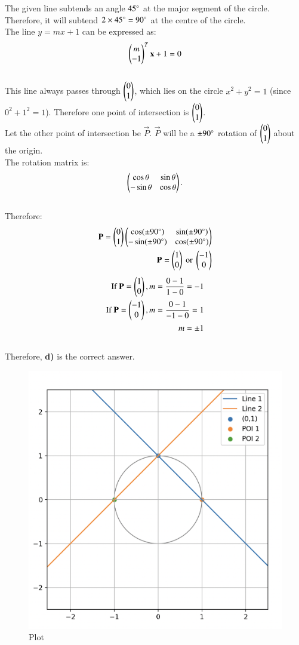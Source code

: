 \documentclass[12pt]{article}
\begin{document}
The given line subtends an angle $45\degree$ at the major segment of the circle. Therefore, it will subtend $2\times 45\degree = 90\degree$ at the centre of the circle.\vspace{0.6cm}\\
The line $y = mx + 1$ can be expressed as:
\begin{align}
    \begin{pmatrix}m\\-1\end{pmatrix}^T\mathbf{x} + 1 =0
\end{align}\\
This line always passes through $\begin{pmatrix}0\\1\end{pmatrix}$, which lies on the circle $x^2 + y^2 = 1$ (since $0^2 + 1^2 = 1$). Therefore one point of intersection is $\begin{pmatrix}0\\1\end{pmatrix}$.\vspace{0.6cm}\\
Let the other point of intersection be $\vec{P}$. $\vec{P}$ will be a $\pm 90\degree$ rotation of $\begin{pmatrix}0\\1\end{pmatrix}$ about the origin.\vspace{0.6cm}\\
The rotation matrix is:
\begin{align}
\begin{pmatrix}\cos\theta & \sin\theta \\ -\sin\theta & \cos\theta\end{pmatrix}.
\end{align}\\
Therefore:
\begin{align}
\mathbf{P}= \begin{pmatrix}0\\1\end{pmatrix}\begin{pmatrix}\cos(\pm90\degree) & \sin(\pm90\degree) \\ -\sin(\pm90\degree) & \cos(\pm90\degree)\end{pmatrix}\\
\mathbf{P} = \begin{pmatrix}1\\0\end{pmatrix} \text{ or } \begin{pmatrix}-1\\0\end{pmatrix}
\end{align}
\begin{align}
\text{If } \mathbf{P} = \begin{pmatrix}1\\0\end{pmatrix}, m = \frac{0-1}{1-0} = -1   \\
\text{If } \mathbf{P} = \begin{pmatrix}-1\\0\end{pmatrix}, m = \frac{0-1}{-1-0} = 1 \\
m = \pm1
\end{align}\\
Therefore, \textbf{d)} is the correct answer.

\begin{figure}[H]
    \centering
    \includegraphics[width=0.6\columnwidth]{Figs/7411.png}
    \caption{Plot}
    \label{fig:placeholder}
\end{figure}
\end{document}
